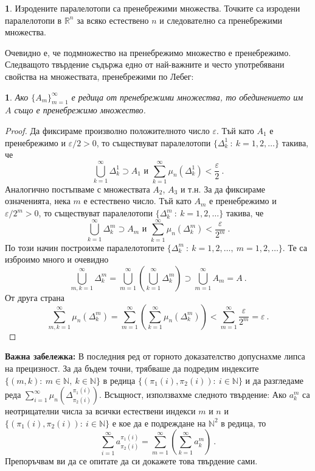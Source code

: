\documentclass[11pt]{article}
\numberwithin{equation}{section}
\numberwithin{figure}{section}
\numberwithin{table}{section}
\theoremstyle{plain}
\theoremstyle{definition}
\theoremstyle{remark}
\theoremstyle{definition}
\theoremstyle{remark}
\theoremstyle{plain}
\theoremstyle{definition}
\theoremstyle{definition}
\newtheorem{example}[thm]{\protect\examplename}
\theoremstyle{plain}
\theoremstyle{plain}
\newtheorem{prop}[thm]{\protect\propositionname}
\theoremstyle{plain}
\theoremstyle{definition}
\theoremstyle{plain}
\providecommand{\examplename}{Пример}
\providecommand{\propositionname}{Твърдение}
\newcommand*{\R}{\mathbb{R}}
\newcommand*{\N}{\mathbb{N}}
\begin{document}
\begin{example}
Изродените паралелотопи са пренебрежими множества.
Точките са изродени паралелотопи в $\R^n$ за всяко естествено $n$ и следователно са пренебрежими множества.
\end{example}

Очевидно е, че подмножество на пренебрежимо множество е пренебрежимо. Следващото твърдение съдържа едно от най-важните и често употребявани свойства на множествата, пренебрежими по Лебег:
\begin{prop}\label{countable_unions}
Ако $\{A_m\}_{m=1}^\infty$ е редица от пренебрежими множества, то обединението им $A$ също е пренебрежимо множество.
\end{prop}

\begin{proof} Да фиксираме произволно положителното число $\varepsilon$. Тъй като $A_1$ е пренебрежимо и $\varepsilon/2 >0$, то съществуват паралелотопи $\{ \Delta^1_k \ : \ k=1,2, \dots \}$ такива, че
$$\bigcup_{k=1}^\infty \Delta_k^1 \supset A_1  \mbox{ и } \sum_{k=1}^\infty \mu_n(\Delta_k^1)<\frac{\varepsilon}{2} \ .$$
Аналогично постъпваме с множествата $A_2$, $A_3$ и т.н. За да фиксираме означенията, нека $m$ е естествено число. Тъй като $A_m$ е пренебрежимо и $\varepsilon/2^m >0$, то съществуват паралелотопи $\{ \Delta^m_k \ : \ k=1,2, \dots \}$ такива, че
$$\bigcup_{k=1}^\infty \Delta_k^m \supset A_m  \mbox{ и } \sum_{k=1}^\infty \mu_n(\Delta_k^m)<\frac{\varepsilon}{2^m} \ .$$
По този начин построихме паралелотопите $\{ \Delta^m_k \ : \ k=1,2, \dots , \ m=1, 2, \dots\}$. Те са изброимо много и очевидно
$$\bigcup_{m,k=1}^\infty \Delta^m_k =\bigcup_{m=1}^\infty \left( \bigcup_{k=1}^\infty \Delta^m_k\right)\supset
\bigcup_{m=1}^\infty A_m = A \ .$$
От друга страна
$$\sum_{m,k=1}^\infty \mu_n\left(\Delta^m_k \right)=\sum_{m=1}^\infty \left( \sum_{k=1}^\infty \mu_n\left(\Delta^m_k \right)\right)<
\sum_{m=1}^\infty \frac{\varepsilon}{2^m} = \varepsilon \ .$$
\end{proof}


\textbf{Важна забележка:} В последния ред от горното доказателство допуснахме липса на прецизност. За да бъдем точни, трябваше да подредим индексите $\{ (m,k): \ m\in \N, \ k\in \N\}$  в редица $\{ (\pi_1 (i), \pi_2(i)) : \ i\in \N \}$ и да разгледаме реда $\sum_{i=1}^\infty \mu_n\left(\Delta^{\pi_1 (i)}_{\pi_2(i)} \right)$. Всъщност, използвахме следното твърдение: Ако $a^m_k$ са неотрицателни числа за всички естествени индекси $m$ и $n$ и $\{ (\pi_1 (i), \pi_2(i)) : \ i\in \N \}$ е кое да е подреждане на $\N^2$ в редица, то
$$\sum_{i=1}^\infty a^{\pi_1 (i)}_{\pi_2(i)} =\sum_{m=1}^\infty \left( \sum_{k=1}^\infty a^m_k\right) \ .$$
Препоръчвам ви да се опитате да си докажете това твърдение сами.
\end{document}
